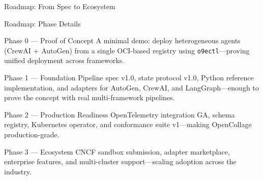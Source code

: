 \begin{frame}{Roadmap: From Spec to Ecosystem}
\begin{center}
  \end{center}

\end{frame}

\begin{frame}{Roadmap: Phase Details}
  \vspace{-0.3cm}
  \begin{exampleblock}{Phase 0 --- Proof of Concept}
    \scriptsize
    A minimal demo: deploy heterogeneous agents (CrewAI + AutoGen) from a single
    OCI-based registry using \texttt{o9ectl}---proving unified deployment across frameworks.
  \end{exampleblock}
  \vspace{-0.15cm}
  \begin{block}{Phase 1 --- Foundation}
    \scriptsize
    Pipeline spec v1.0, state protocol v1.0, Python reference implementation,
    and adapters for AutoGen, CrewAI, and LangGraph---enough to prove the concept
    with real multi-framework pipelines.
  \end{block}
  \vspace{-0.15cm}
  \begin{block}{Phase 2 --- Production Readiness}
    \scriptsize
    OpenTelemetry integration GA, schema registry, Kubernetes operator,
    and conformance suite v1---making OpenCollage production-grade.
  \end{block}
  \vspace{-0.15cm}
  \begin{block}{Phase 3 --- Ecosystem}
    \scriptsize
    CNCF sandbox submission, adapter marketplace, enterprise features,
    and multi-cluster support---scaling adoption across the industry.
  \end{block}
\end{frame}
